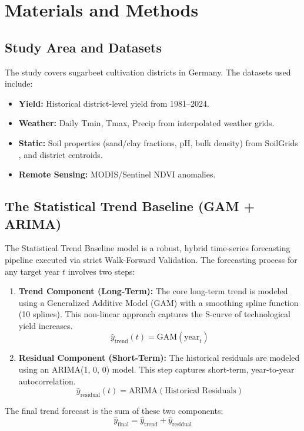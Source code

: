 \section{Materials and Methods}

\subsection{Study Area and Datasets}
The study covers sugarbeet cultivation districts in Germany. The datasets used include:
\begin{itemize}
    \item \textbf{Yield:} Historical district-level yield from 1981--2024.
    \item \textbf{Weather:} Daily Tmin, Tmax, Precip from interpolated weather grids.
    \item \textbf{Static:} Soil properties (sand/clay fractions, pH, bulk density) from SoilGrids \cite{hengl2017soilgrids250m}, and district centroids.
    \item \textbf{Remote Sensing:} MODIS/Sentinel NDVI anomalies.
\end{itemize}

\subsection{The Statistical Trend Baseline (GAM + ARIMA)}
The Statistical Trend Baseline model is a robust, hybrid time-series forecasting pipeline executed via strict Walk-Forward Validation.
The forecasting process for any target year $t$ involves two steps:

\begin{enumerate}
    \item \textbf{Trend Component (Long-Term):} The core long-term trend is modeled using a Generalized Additive Model (GAM) with a smoothing spline function (10 splines). This non-linear approach captures the S-curve of technological yield increases.
    \[ \hat{y}_{\text{trend}}(t) = \text{GAM}(\text{year}_t) \]

    \item \textbf{Residual Component (Short-Term):} The historical residuals are modeled using an ARIMA(1, 0, 0) model. This step captures short-term, year-to-year autocorrelation.
    \[ \hat{y}_{\text{residual}}(t) = \text{ARIMA}(\text{Historical Residuals}) \]
\end{enumerate}

The final trend forecast is the sum of these two components:
\[ \hat{y}_{\text{final}} = \hat{y}_{\text{trend}} + \hat{y}_{\text{residual}} \]

